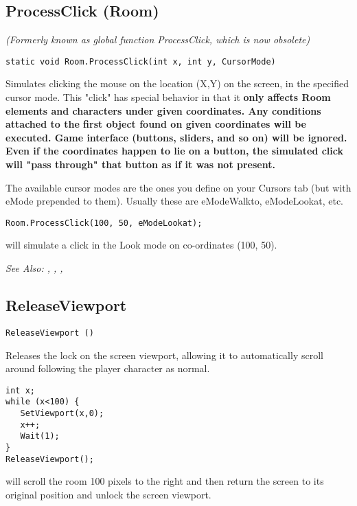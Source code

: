 \subsection{ProcessClick (Room)}\label{Room.ProcessClick}%

\it{(Formerly known as global function ProcessClick, which is now obsolete)}

\begin{verbatim}
static void Room.ProcessClick(int x, int y, CursorMode)
\end{verbatim}
Simulates clicking the mouse on the location (X,Y) on the screen, in the
specified cursor mode. This "click" has special behavior in that it \bf{only
affects Room elements and characters} under given coordinates. Any conditions attached
to the first object found on given coordinates will be executed. Game interface
(buttons, sliders, and so on) will be \bf{ignored}. Even if the coordinates happen
to lie on a button, the simulated click will "pass through" that button as if it
was not present.

The available cursor modes are the ones you define on your Cursors tab (but with eMode
prepended to them). Usually these are eModeWalkto, eModeLookat, etc.

\begin{verbatim}
Room.ProcessClick(100, 50, eModeLookat);
\end{verbatim}
will simulate a click in the Look mode on co-ordinates (100, 50).

\it{See Also:} ,
,
,


\subsection{ReleaseViewport}\label{ReleaseViewport}%

\begin{verbatim}
ReleaseViewport ()
\end{verbatim}
Releases the lock on the screen viewport, allowing it to automatically
scroll around following the player character as normal.

\begin{verbatim}
int x;
while (x<100) {
   SetViewport(x,0);
   x++;
   Wait(1);
}
ReleaseViewport();
\end{verbatim}
will scroll the room 100 pixels to the right and then return the screen to its original position and unlock the screen viewport.

